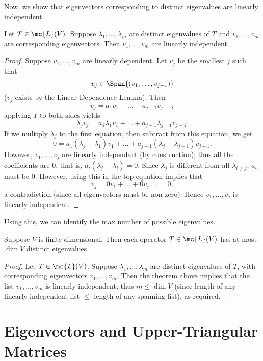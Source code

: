 \documentclass[math0540-lecture-notes.tex]{subfiles}
\begin{document}
Now, we show that eigenvectors corresponding to distinct eigenvalues are linearly independent.
\begin{proposition}{}
  Let $T\in \mc{L}(V)$. Suppose $\lambda_1,\ldots,\lambda_m$ are distinct eigenvalues of $T$ and
  $v_1,\ldots,v_m$ are corresponding eigenvectors. Then $v_1,\ldots,v_m$ are linearly independent.
\end{proposition}
\begin{proof}[Proof]
  Suppose $v_1,\ldots,v_m$ are linearly dependent. Let $v_j$ be the smallest $j$ such that \[
    v_j\in \Span{(v_1,\ldots,v_{j-1})}
  \] ($v_j$ exists by the Linear Dependence Lemma). Then \[
    v_j=a_1v_1+\ldots+a_{j-1}v_{j-1}\label{1}
  ;\] applying $T$ to both sides yields \[
    \lambda_jv_j=a_1\lambda_1v_1+\ldots+a_{j-1}\lambda_{j-1}v_{j-1}
  .\] If we multiply $\lambda_j$ to the first equation, then subtract from this equation, we get \[
    0=a_1(\lambda_j-\lambda_1)v_1+\ldots+a_{j-1}(\lambda_j-\lambda_{j-1})v_{j-1}
  .\] However, $v_1,\ldots,v_j$ are linearly independent (by construction); thus all the
  coefficients are $0$; that is, $a_i(\lambda_j-\lambda_i)=0$. Since $\lambda_j$ is different from
  all $\lambda_{i\neq j}$, $a_i$ must be $0$. However, using this in the top equation implies that
  \[
    v_j=0v_1+\ldots+0v_{j-1}=0
  ,\] a contradiction (since all eigenvectors must be non-zero). Hence $v_1,\ldots,v_j$ is linearly
  independent.
\end{proof}

Using this, we can identify the max number of possible eigenvalues.
\begin{corollary}{}
  Suppose $V$ is finite-dimensional. Then each operator $T\in \mc{L}(V)$ has at most $\dim{V}$
  distinct eigenvalues.
\end{corollary}
\begin{proof}[Proof]
  Let $T\in \mc{L}(V)$. Suppose $\lambda_1,\ldots,\lambda_m$ are distinct eigenvalues of $T$, with
  corresponding eigenvectors $v_1,\ldots,v_m$. Then the theorem above implies that the list
  $v_1,\ldots,v_m$ is linearly independent; thus $m\le \dim{V}$ (since length of any linearly
  independent list $\le $ length of any spanning list), as required.
\end{proof}


\section{Eigenvectors and Upper-Triangular Matrices}
\end{document}
